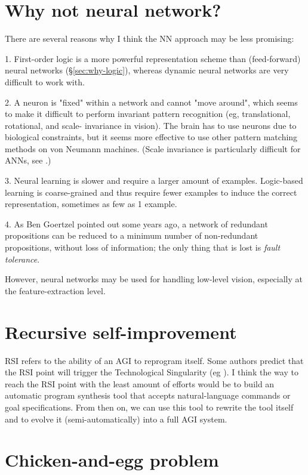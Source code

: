 \section{Why not neural network?}

There are several reasons why I think the NN approach may be less promising:

1.  First-order logic is a more powerful representation scheme than (feed-forward) neural networks (\S\ref{sec:why-logic}), whereas dynamic neural networks are very difficult to work with.

2.  A neuron is "fixed" within a network and cannot "move around", which seems to make it difficult to perform invariant pattern recognition (eg, translational, rotational, and scale- invariance in vision). The brain has to use neurons due to biological constraints, but it seems more effective to use other pattern matching methods on von Neumann machines. (Scale invariance is particularly difficult for ANNs, see \citep*{Muresan2004}.)

3.  Neural learning is slower and require a larger amount of examples. Logic-based learning is coarse-grained and thus require fewer examples to induce the correct representation, sometimes as few as 1 example.

4.  As Ben Goertzel pointed out some years ago, a network of redundant propositions can be reduced to a minimum number of non-redundant propositions, without loss of information;  the only thing that is lost is \textit{fault tolerance}.

However, neural networks may be used for handling low-level vision, especially at the feature-extraction level.

\section{Recursive self-improvement}
\label{sec:RSI}

RSI refers to the ability of an AGI to reprogram itself.  Some authors predict that the RSI point will trigger the Technological Singularity (eg \citep*{Kurzweil2005}).  I think the way to reach the RSI point with the least amount of efforts would be to build an automatic program synthesis tool that accepts natural-language commands or goal specifications.  From then on, we can use this tool to rewrite the tool itself and to evolve it (semi-automatically) into a full AGI system.

\section{Chicken-and-egg problem}
\label{sec:chicken-and-egg}

